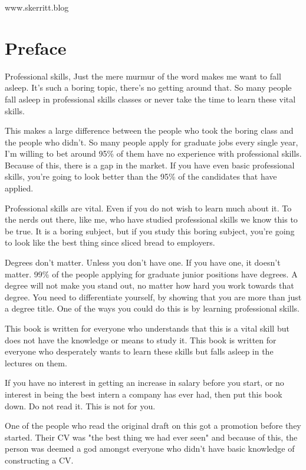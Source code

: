 \documentclass{article}
\begin{document}
www.skerritt.blog
\newpage
\newpage
\tableofcontents
\newpage
{}
\setcounter{page}{1}
\section{Preface}
Professional skills, Just the mere murmur of the word makes me want to
fall asleep. It's such a boring topic, there's no getting around that.
So many people fall asleep in professional skills classes or never take
the time to learn these vital skills.

This makes a large difference between the people who took the boring
class and the people who didn't. So many people apply for graduate jobs
every single year, I'm willing to bet around 95\% of them have no
experience with professional skills. Because of this, there is a gap in
the market. If you have even basic professional skills, you're going to
look better than the 95\% of the candidates that have applied.

Professional skills are vital. Even if you do not wish to learn much
about it. To the nerds out there, like me, who have studied professional
skills we know this to be true. It is a boring subject, but if you study
this boring subject, you're going to look like the best thing since
sliced bread to employers.

Degrees don't matter. Unless you don't have one. If you have one, it
doesn't matter. 99\% of the people applying for graduate junior
positions have degrees. A degree will not make you stand out, no matter
how hard you work towards that degree. You need to differentiate
yourself, by showing that you are more than just a degree title. One of
the ways you could do this is by learning professional skills.

This book is written for everyone who understands that this is a vital
skill but does not have the knowledge or means to study it. This book is
written for everyone who desperately wants to learn these skills but
falls asleep in the lectures on them.

If you have no interest in getting an increase in salary before you
start, or no interest in being the best intern a company has ever had,
then put this book down. Do not read it. This is not for you.

One of the people who read the original draft on this got a promotion
before they started. Their CV was "the best thing we had ever seen"
and because of this, the person was deemed a god amongst everyone who
didn't have basic knowledge of constructing a CV.
\end{document}
